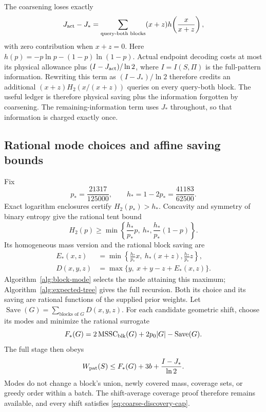 The coarsening loses exactly
\[
 J_{\rm act}-J_*
 =\sum_{\text{query-both blocks}}
 (x+z)h\!\left(\frac{x}{x+z}\right),
\]
with zero contribution when $x+z=0$. Here
$h(p)=-p\ln p-(1-p)\ln(1-p)$. Actual endpoint decoding costs
at most its physical allowance plus $(I-J_{\rm act})/\ln2$,
where $I=I(S,\Pi)$ is the full-pattern information. Rewriting this
term as $(I-J_*)/\ln2$ therefore credits an additional
$(x+z)H_2(x/(x+z))$ queries on every query-both block. The useful ledger is therefore physical saving plus the information
forgotten by coarsening. The remaining-information term uses $J_*$
throughout, so that information is charged exactly once.

\subsection{Rational mode choices and affine saving bounds}

Fix
\[
 p_* =\frac{21317}{125000},\qquad
 h_* =1-2p_* =\frac{41183}{62500}.
\]
Exact logarithm enclosures certify $H_2(p_*)>h_*$. Concavity and
symmetry of binary entropy give the rational tent bound
\[
 H_2(p)\ge\min\left\{\frac{h_*}{p_*}p,\ h_*,
                         \frac{h_*}{p_*}(1-p)\right\}.
\]
Its homogeneous mass version and the rational block saving are
\begin{equation}\label{eq:rational-block-saving}
 \begin{aligned}
 E_*(x,z)&=\min\left\{\frac{h_*}{p_*}x,\ h_*(x+z),
                                  \frac{h_*}{p_*}z\right\},\\
 D(x,y,z)&=\max\{y,\ x+y-z+E_*(x,z)\}.
 \end{aligned}
\end{equation}
Algorithm~\ref{alg:block-mode} selects the mode attaining this maximum;
Algorithm~\ref{alg:expected-tree} gives the full recursion. Both its choice and its saving
are rational functions of the supplied prior weights. Let
$\operatorname{Save}(G)=\sum_{\text{blocks of }G}D(x,y,z)$.
For each candidate geometric shift, choose its modes and minimize
the rational surrogate
\begin{equation}\label{eq:adaptive-shift-objective}
 F_*(G)=2\operatorname{MSSC}_{\rm blk}(G)+2p_0|G|-\operatorname{Save}(G).
\end{equation}
The full stage then obeys
\begin{equation}\label{eq:adaptive-stage}
 W_{\rm pat}(S)\le F_*(G)+3b+\frac{I-J_*}{\ln2}.
\end{equation}
Modes do not change a block's union, newly covered mass, coverage sets,
or greedy order within a batch. The shift-average coverage proof
therefore remains available, and every shift satisfies
\eqref{eq:coarse-discovery-cap}.


